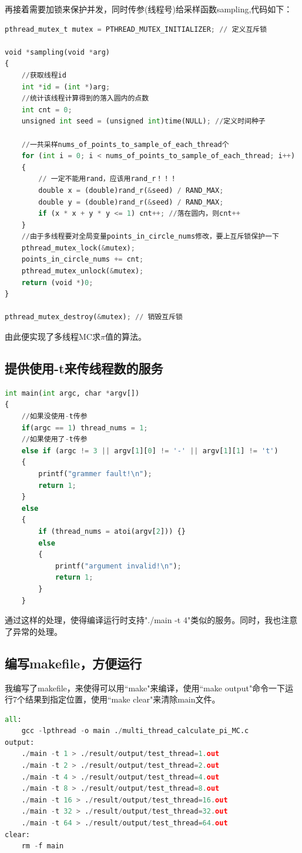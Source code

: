 \documentclass{LabReport}
\begin{document}
	再接着需要加锁来保护并发，同时传参(线程号)给采样函数sampling,代码如下：
	
	\begin{lstlisting}[language=python,frame=shadowbox]
pthread_mutex_t mutex = PTHREAD_MUTEX_INITIALIZER; // 定义互斥锁		

void *sampling(void *arg)
{
	//获取线程id
	int *id = (int *)arg;
	//统计该线程计算得到的落入圆内的点数
	int cnt = 0;
	unsigned int seed = (unsigned int)time(NULL); //定义时间种子
	
	//一共采样nums_of_points_to_sample_of_each_thread个
	for (int i = 0; i < nums_of_points_to_sample_of_each_thread; i++)
	{
		// 一定不能用rand，应该用rand_r！！！
		double x = (double)rand_r(&seed) / RAND_MAX;
		double y = (double)rand_r(&seed) / RAND_MAX;
		if (x * x + y * y <= 1) cnt++; //落在圆内，则cnt++
	}
	//由于多线程要对全局变量points_in_circle_nums修改，要上互斥锁保护一下
	pthread_mutex_lock(&mutex);
	points_in_circle_nums += cnt;
	pthread_mutex_unlock(&mutex);
	return (void *)0;
}

pthread_mutex_destroy(&mutex); // 销毁互斥锁
	\end{lstlisting}
	
	由此便实现了多线程MC求$\pi$值的算法。
	
	\subsection{提供使用-t来传线程数的服务}
	
		\begin{lstlisting}[language=python,frame=shadowbox]
int main(int argc, char *argv[])
{
	//如果没使用-t传参
	if(argc == 1) thread_nums = 1;
	//如果使用了-t传参
	else if (argc != 3 || argv[1][0] != '-' || argv[1][1] != 't')
	{
		printf("grammer fault!\n");
		return 1;
	}
	else
	{
		if (thread_nums = atoi(argv[2])) {}
		else
		{
			printf("argument invalid!\n");
			return 1;
		}
	}
	\end{lstlisting}
	
	通过这样的处理，使得编译运行时支持"./main -t 4"类似的服务。同时，我也注意了异常的处理。
	
	\subsection{编写makefile，方便运行}
	我编写了makefile，来使得可以用``make"来编译，使用``make output"命令一下运行7个结果到指定位置，使用``make clear"来清除main文件。
	\begin{lstlisting}[language=python,frame=shadowbox]
all:
	gcc -lpthread -o main ./multi_thread_calculate_pi_MC.c
output: 
	./main -t 1 > ./result/output/test_thread=1.out
	./main -t 2 > ./result/output/test_thread=2.out
	./main -t 4 > ./result/output/test_thread=4.out
	./main -t 8 > ./result/output/test_thread=8.out
	./main -t 16 > ./result/output/test_thread=16.out
	./main -t 32 > ./result/output/test_thread=32.out
	./main -t 64 > ./result/output/test_thread=64.out
clear:
	rm -f main
	\end{lstlisting}
	
\end{document}
